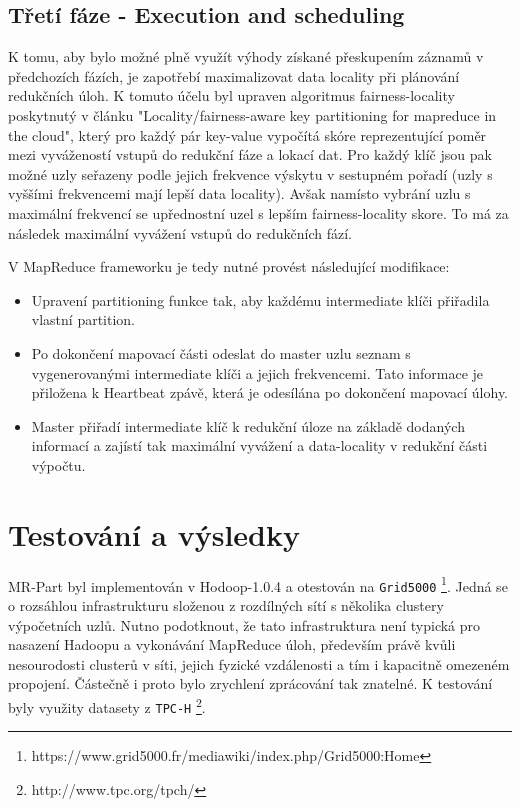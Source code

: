 \documentclass[thesis=M,czech]{FITthesis}[2012/06/26]
\begin{document}
\subsection{Třetí fáze - Execution and scheduling}
K tomu, aby bylo možné plně využít výhody získané přeskupením záznamů v předchozích fázích, je zapotřebí maximalizovat data locality při plánování redukčních úloh. K tomuto účelu byl upraven algoritmus fairness-locality poskytnutý v článku "Locality/fairness-aware key partitioning for mapreduce in the cloud"\cite{cloudcom}, který pro každý pár key-value vypočítá skóre reprezentující poměr mezi vyvážeností vstupů do redukční fáze a lokací dat. Pro každý klíč jsou pak možné uzly seřazeny podle jejich frekvence výskytu v sestupném pořadí (uzly s vyššími frekvencemi mají lepší data locality). Avšak namísto vybrání uzlu s maximální frekvencí se upřednostní uzel s lepším fairness-locality skore. To má za následek maximální vyvážení vstupů do redukčních fází.

V MapReduce frameworku je tedy nutné provést následující modifikace:

\begin{itemize}
  \item Upravení partitioning funkce tak, aby každému intermediate klíči přiřadila vlastní partition.
  \item Po dokončení mapovací části odeslat do master uzlu seznam s vygenerovanými intermediate klíči a jejich frekvencemi. Tato informace je přiložena k Heartbeat zpávě, která je odesílána po dokončení mapovací úlohy.
  \item Master přiřadí  intermediate klíč k redukční úloze na základě dodaných informací a zajístí tak maximální vyvážení a data-locality v redukční části výpočtu.
\end{itemize} 

\section{Testování a výsledky}
MR-Part byl implementován v Hodoop-1.0.4 a otestován na \texttt{Grid5000} \footnote{https://www.grid5000.fr/mediawiki/index.php/Grid5000:Home}. Jedná se o  rozsáhlou infrastrukturu složenou z rozdílných sítí s několika clustery výpočetních uzlů. Nutno podotknout, že tato infrastruktura není typická pro nasazení Hadoopu a vykonávání MapReduce úloh, především právě  kvůli nesourodosti clusterů v síti, jejich fyzické vzdálenosti a tím i kapacitně omezeném propojení. Částečně i proto bylo zrychlení zprácování tak znatelné. K testování byly využity datasety z \texttt{TPC-H} \footnote{http://www.tpc.org/tpch/}. 
\end{document}
